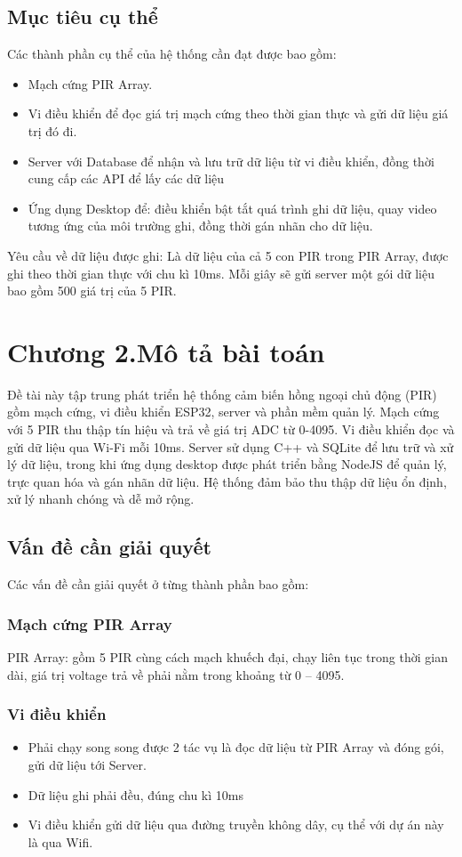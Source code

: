 \documentclass{article}
\begin{document}
\subsection{Mục tiêu cụ thể}
Các thành phần cụ thể của hệ thống cần đạt được bao gồm: 
\begin{itemize}
    \item Mạch cứng PIR Array. 
    \item Vi điều khiển để đọc giá trị mạch cứng theo thời gian thực và gửi dữ liệu giá trị đó đi. 
    \item Server với Database để nhận và lưu trữ dữ liệu từ vi điều khiển, đồng thời cung cấp các API để lấy các dữ liệu
    \item Ứng dụng Desktop để: điều khiển bật tắt quá trình ghi dữ liệu, quay video tương ứng của môi trường ghi, đồng thời gán nhãn cho dữ liệu. 
\end{itemize}
Yêu cầu về dữ liệu được ghi: Là dữ liệu của cả 5 con PIR trong PIR Array, được ghi theo thời gian thực với chu kì 10ms. Mỗi giây sẽ gửi server một gói dữ liệu bao gồm 500 giá trị của 5  PIR. 
\cleardoublepage
\section*{Chương 2.Mô tả bài toán}
\setcounter{section}{2}
\setcounter{subsection}{0}
Đề tài này tập trung phát triển hệ thống cảm biến hồng ngoại chủ động (PIR) gồm mạch cứng, vi điều khiển ESP32, server và phần mềm quản lý. Mạch cứng với 5 PIR thu thập tín hiệu và trả về giá trị ADC từ 0-4095. Vi điều khiển đọc và gửi dữ liệu qua Wi-Fi mỗi 10ms. Server sử dụng C++ và SQLite để lưu trữ và xử lý dữ liệu, trong khi ứng dụng desktop được phát triển bằng NodeJS để quản lý, trực quan hóa và gán nhãn dữ liệu. Hệ thống đảm bảo thu thập dữ liệu ổn định, xử lý nhanh chóng và dễ mở rộng.
\subsection{Vấn đề cần giải quyết}
Các vấn đề cần giải quyết ở từng thành phần bao gồm: 
\subsubsection{Mạch cứng PIR Array }
PIR Array: gồm 5 PIR cùng cách mạch khuếch đại, chạy liên tục trong thời gian dài, giá trị voltage trả về phải nằm trong khoảng từ 0 – 4095.
\subsubsection{Vi điều khiển}
\begin{itemize}
    \item Phải chạy song song được 2 tác vụ là đọc dữ liệu từ PIR Array và đóng gói, gửi dữ liệu tới Server. 
    \item Dữ liệu ghi phải đều, đúng chu kì 10ms
    \item Vi điều khiển gửi dữ liệu qua đường truyền không dây, cụ thể với dự án này là qua Wifi. 
\end{itemize}
\end{document}
